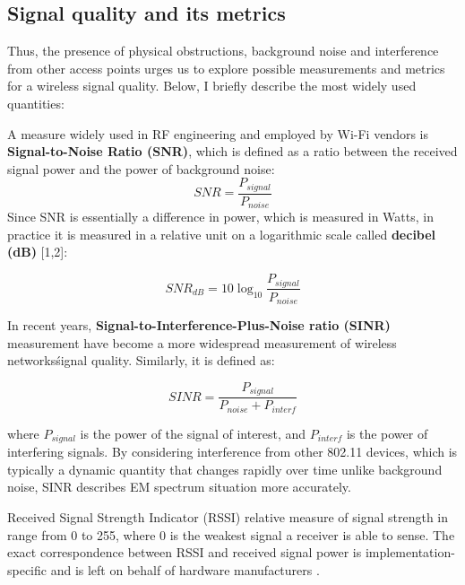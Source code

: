 \subsection{Signal quality and its metrics}

Thus, the presence of physical obstructions, background noise and interference from other access points urges us to explore possible measurements and metrics for a wireless signal quality. Below, I briefly describe the most widely used quantities:

A measure widely used in RF engineering and employed by Wi-Fi vendors is \textbf{Signal-to-Noise Ratio (SNR)}, which is defined as a ratio between the received signal power and the power of background noise:
\begin{equation}
    \label{formula:snr}
    SNR = \frac{P_{signal}}{P_{noise}}
\end{equation}
    Since SNR is essentially a difference in power, which is measured in Watts, in practice it is measured in a relative unit on a logarithmic scale called \textbf{decibel (dB)} [1,2]:

\begin{equation}
    \label{formula:snr_db}
    {SNR}_{dB} = 10\log_{10}\frac{P_{signal}}{P_{noise}}
\end{equation}

In recent years, \textbf{Signal-to-Interference-Plus-Noise ratio (SINR)} measurement have become a more widespread measurement of wireless networks\' signal quality. Similarly, it is defined as:

\begin{equation}
    \label{formula:sinr}
    SINR = \frac{P_{signal}}{P_{noise} + P_{interf}}
\end{equation}

    where $P_{signal}$ is the power of the signal of interest, and $P_{interf}$ is the power of interfering signals.
    By considering interference from other 802.11 devices, which is typically a dynamic quantity that changes rapidly over time unlike background noise, SINR describes EM spectrum situation more accurately.

Received Signal Strength Indicator (RSSI) relative measure of signal strength in range from 0 to 255, where 0 is the weakest signal a receiver is able to sense. The exact correspondence between RSSI and received signal power is implementation-specific and is left on behalf of hardware manufacturers \cite{colemanCWNACertifiedWireless2021}.


